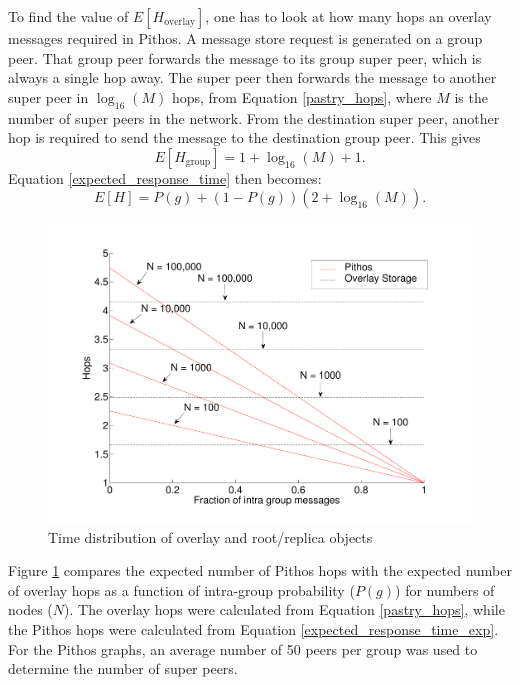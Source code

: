 \documentclass[10pt,a4paper,conference]{IEEEtran}
\begin{document}
To find the value of $E\left[H_{\textrm{overlay}}\right]$, one has to look at how many hops an overlay messages required in Pithos. A message store
request is generated on a group peer. That group peer forwards the message to its group super peer, which is always a single hop away. The super peer
then forwards the message to another super peer in $\log_{16}(M)$ hops, from Equation \eqref{pastry_hops}, where $M$ is the number of super peers in
the network. From the destination super peer, another hop is required to send the message to the destination group peer. This gives
%
\begin{equation}\label{group_hops}
    E\left[H_{\textrm{group}}\right] = 1 + \log_{16}(M) + 1.
\end{equation}
%
Equation \eqref{expected_response_time} then becomes:
%
\begin{equation}\label{expected_response_time_exp}
    E[H] = P(g) + \left(1 - P(g)\right)\left(2 + \log_{16}\left(M\right)\right).
\end{equation}

\begin{figure}[htbp]
 \centering
 \includegraphics[clip=true, viewport=2cm 1cm 27cm 19.5cm, width=\columnwidth]{Hops_vsGroupFrac_4n}
 \caption{Time distribution of overlay and root/replica objects}
 \label{fig_hop_compare}
\end{figure}
%
Figure \ref{fig_hop_compare} compares the expected number of Pithos hops with the expected number of overlay hops as a function of intra-group
probability ($P(g)$) for numbers of nodes ($N$). The overlay hops were calculated from Equation \eqref{pastry_hops}, while the Pithos hops were
calculated from Equation \eqref{expected_response_time_exp}. For the Pithos graphs, an average number of 50 peers per group was used to determine the
number of super peers.
\end{document}
